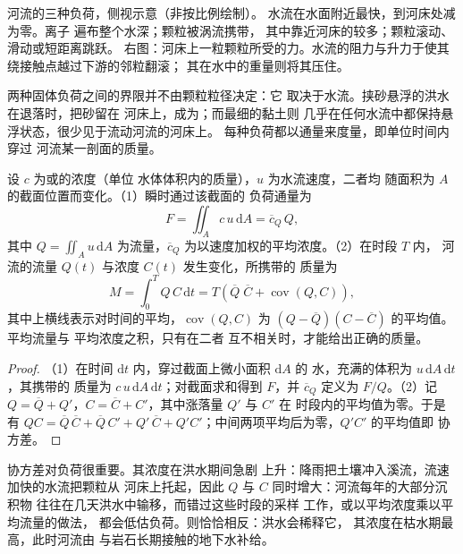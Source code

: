 \begin{omfigure}
{\small 河流的三种负荷，侧视示意（非按比例绘制）。
水流在水面附近最快，到河床处减为零。离子
遍布整个水深；颗粒被涡流携带，
其中靠近河床的较多；颗粒滚动、滑动或短距离跳跃。
右图：河床上一粒颗粒所受的力。水流的阻力与升力于使其
绕接触点越过下游的邻粒翻滚；
其在水中的重量则将其压住。}
\label{fig:b1:erosion-transport:loads}
\end{omfigure}

两种固体负荷之间的界限并不由颗粒粒径决定：它
取决于水流。挟砂悬浮的洪水在退落时，把砂留在
河床上，成为；而最细的黏土则
几乎在任何水流中都保持悬浮状态，很少见于流动河流的河床上。
每种负荷都以通量来度量，即单位时间内穿过
河流某一剖面的质量。

\begin{proposition}[负荷的通量]\label{prop:b1:erosion-transport:flux}
设 $c$ 为或的浓度（单位
水体体积内的质量），$u$ 为水流速度，二者均
随面积为 $A$ 的截面位置而变化。（1）瞬时通过该截面的
负荷通量为
\[
  F = \iint_A c\,u\,\mathrm dA = \overline{c}_Q\,Q,
\]
其中 $Q = \iint_A u\,\mathrm dA$ 为流量，$\overline{c}_Q$
为以速度加权的平均浓度。（2）在时段 $T$ 内，
河流的流量 $Q(t)$ 与浓度 $C(t)$ 发生变化，所携带的
质量为
\[
  M = \int_0^T Q\,C\,\mathrm dt = T\left(\overline{Q}\;\overline{C} +
  \operatorname{cov}(Q, C)\right),
\]
其中上横线表示对时间的平均，$\operatorname{cov}(Q, C)$ 为
$(Q - \overline{Q})(C - \overline{C})$ 的平均值。平均流量与
平均浓度之积，只有在二者
互不相关时，才能给出正确的质量。
\end{proposition}

\begin{proof}
（1）在时间 $\mathrm dt$ 内，穿过截面上微小面积 $\mathrm dA$ 的
水，充满的体积为 $u\,\mathrm dA\,\mathrm dt$，其携带的
质量为 $c\,u\,\mathrm dA\,\mathrm dt$；对截面求和得到 $F$，并
$\overline{c}_Q$ 定义为 $F/Q$。（2）记 $Q = \overline{Q} + Q'$，$C =
\overline{C} + C'$，其中涨落量 $Q'$ 与 $C'$ 在
时段内的平均值为零。于是有 $QC = \overline{Q}\,\overline{C} + \overline{Q}\,C' + Q'\,\overline{C}
+ Q'C'$；中间两项平均后为零，$Q'C'$ 的平均值即
协方差。
\end{proof}

协方差对负荷很重要。其浓度在洪水期间急剧
上升：降雨把土壤冲入溪流，流速加快的水流把颗粒从
河床上托起，因此 $Q$ 与 $C$ 同时增大：河流每年的大部分沉积物
往往在几天洪水中输移，而错过这些时段的采样
工作，或以平均浓度乘以平均流量的做法，
都会低估负荷。则恰恰相反：洪水会稀释它，
其浓度在枯水期最高，此时河流由
与岩石长期接触的地下水补给。

